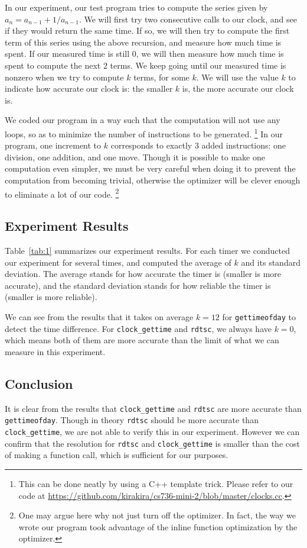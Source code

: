 \documentclass{article}
\begin{document}
In our experiment, our test program tries to compute the series given by $a_n=a_{n-1}+1/a_{n-1}$.
We will first try two consecutive calls to our clock, and see if they would return the same time.
If so, we will then try to compute the first term of this series using the above recursion, and measure how much time is spent.
If our measured time is still $0$, we will then measure how much time is spent to compute the next $2$ terms.
We keep going until our measured time is nonzero when we try to compute $k$ terms, for some $k$.
We will use the value $k$ to indicate how accurate our clock is: the smaller $k$ is, the more accurate our clock is.

We coded our program in a way such that the computation will not use any loops, so as to minimize the number of instructions to be generated.
\footnote{This can be done neatly by using a C++ template trick.
Please refer to our code at \url{https://github.com/kirakira/cs736-mini-2/blob/master/clocks.cc}.}
In our program, one increment to $k$ corresponds to exactly $3$ added instructions: one division, one addition, and one move.
Though it is possible to make one computation even simpler, we must be very careful when doing it to prevent the computation from becoming trivial, otherwise the optimizer will be clever enough to eliminate a lot of our code.
\footnote{One may argue here why not just turn off the optimizer.
In fact, the way we wrote our program took advantage of the inline function optimization by the optimizer.}

\subsection{Experiment Results}
Table~\ref{tab:1} summarizes our experiment results.
For each timer we conducted our experiment for several times, and computed the average of $k$ and its standard deviation.
The average stands for how accurate the timer is (smaller is more accurate), and the standard deviation stands for how reliable the timer is (smaller is more reliable).

We can see from the results that it takes on average $k=12$ for \texttt{gettimeofday} to detect the time difference.
For \texttt{clock\_gettime} and \texttt{rdtsc}, we always have $k=0$, which means both of them are more accurate than the limit of what we can measure in this experiment.

\subsection{Conclusion}
It is clear from the results that \texttt{clock\_gettime} and \texttt{rdtsc} are more accurate than \texttt{gettimeofday}.
Though in theory \texttt{rdtsc} should be more accurate than \texttt{clock\_gettime}, we are not able to verify this in our experiment.
However we can confirm that the resolution for \texttt{rdtsc} and \texttt{clock\_gettime} is smaller than the cost of making a function call, which is sufficient for our purposes.
\end{document}
